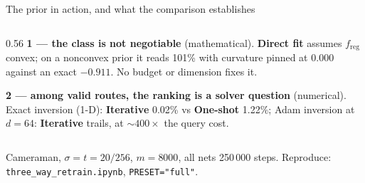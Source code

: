 \documentclass[aspectratio=169,10pt]{beamer}
\newcommand{\Iter}{\textcolor{iter}{\textbf{Iterative}}}
\newcommand{\Osh}{\textcolor{oneshot}{\textbf{One-shot}}}
\newcommand{\Dir}{\textcolor{direct}{\textbf{Direct fit}}}
\newcommand{\freg}{f_{\mathrm{reg}}}
\begin{document}
\begin{frame}{The prior in action, and what the comparison establishes}
\begin{columns}[T]
\begin{column}{0.56\textwidth}
      \vspace{0.35em}
      \textbf{1 --- the class is not negotiable} (mathematical). \Dir{} assumes
      $\freg$ convex; on a nonconvex prior it reads 101\% with curvature pinned at
      $0.000$ against an exact $-0.911$. No budget or dimension fixes it.

      \vspace{0.2em}
      \textbf{2 --- among valid routes, the ranking is a solver question}
      (numerical). Exact inversion (1-D): \Iter{} 0.02\% vs \Osh{} 1.22\%; Adam
      inversion at $d=64$: \Iter{} trails, at ${\sim}400\times$ the query cost.
    \end{column}
  \end{columns}

  \vspace{0.1em}
  {\tiny Cameraman, $\sigma=t=20/256$, $m=8000$, all nets 250\,000 steps.\;
   Reproduce: \texttt{three\_way\_retrain.ipynb}, \texttt{PRESET="full"}.}

\end{frame}
\end{document}
